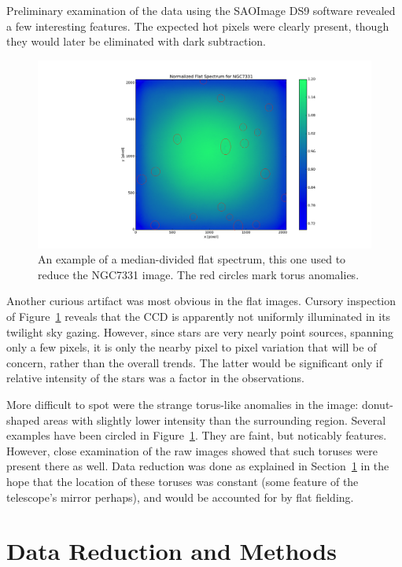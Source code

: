 \documentclass[a4paper,12pt]{article}
\begin{document}
Preliminary examination of the data using the SAOImage DS9 software revealed a few interesting features. The expected hot pixels were clearly present, though they would later be eliminated with dark subtraction. 

\begin{figure}[!htbp]
  \centering
  \includegraphics[width=\linewidth]{flatspectrum2.png}
  \caption{An example of a median-divided flat spectrum, this one used to reduce the NGC7331 image. The red circles mark torus anomalies.}
  \label{fig:flatspec}
\end{figure}

Another curious artifact was most obvious in the flat images. Cursory inspection of Figure~\ref{fig:flatspec} reveals that the CCD is apparently not uniformly illuminated in its twilight sky gazing. However, since stars are very nearly point sources, spanning only a few pixels, it is only the nearby pixel to pixel variation that will be of concern, rather than the overall trends. The latter would be significant only if relative intensity of the stars was a factor in the observations.

More difficult to spot were the strange torus-like anomalies in the image: donut-shaped areas with slightly lower intensity than the surrounding region. Several examples have been circled in Figure~\ref{fig:flatspec}. They are faint, but noticably features. However, close examination of the raw images showed that such toruses were present there as well. Data reduction was done as explained in Section~\ref{sec:data} in the hope that the location of these toruses was constant (some feature of the telescope's mirror perhaps), and would be accounted for by flat fielding.


\section{Data Reduction and Methods}
\label{sec:data}
\end{document}
